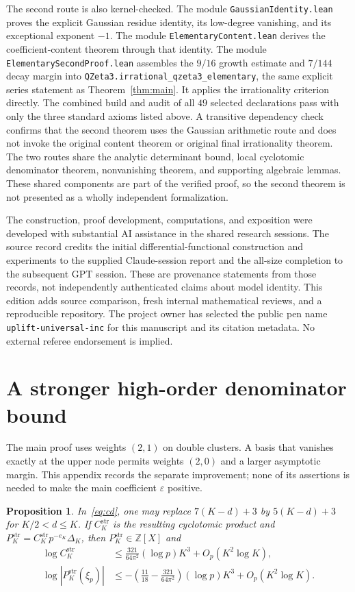 \documentclass[11pt,letterpaper]{article}
\numberwithin{equation}{section}
\newtheorem{proposition}[theorem]{Proposition}
\theoremstyle{remark}
\newcommand{\Z}{\mathbb Z}
\newcommand{\eps}{\varepsilon}
\begin{document}
The second route is also kernel-checked. The module \texttt{GaussianIdentity.lean} proves the explicit Gaussian residue identity, its low-degree vanishing, and its exceptional exponent $-1$. The module \texttt{ElementaryContent.lean} derives the coefficient-content theorem through that identity. The module \texttt{ElementarySecondProof.lean} assembles the $9/16$ growth estimate and $7/144$ decay margin into \texttt{QZeta3.irrational\_qzeta3\_elementary}, the same explicit series statement as Theorem~\ref{thm:main}. It applies the irrationality criterion directly. The combined build and audit of all $49$ selected declarations pass with only the three standard axioms listed above. A transitive dependency check confirms that the second theorem uses the Gaussian arithmetic route and does not invoke the original content theorem or original final irrationality theorem. The two routes share the analytic determinant bound, local cyclotomic denominator theorem, nonvanishing theorem, and supporting algebraic lemmas. These shared components are part of the verified proof, so the second theorem is not presented as a wholly independent formalization.

The construction, proof development, computations, and exposition were developed with substantial AI assistance in the shared research sessions. The source record credits the initial differential-functional construction and experiments to the supplied Claude-session report and the all-size completion to the subsequent GPT session. These are provenance statements from those records, not independently authenticated claims about model identity. This edition adds source comparison, fresh internal mathematical reviews, and a reproducible repository. The project owner has selected the public pen name \texttt{uplift-universal-inc} for this manuscript and its citation metadata. No external referee endorsement is implied.

\appendix
\section{A stronger high-order denominator bound}\label{app:stronger}

The main proof uses weights $(2,1)$ on double clusters. A basis that vanishes exactly at the upper node permits weights $(2,0)$ and a larger asymptotic margin. This appendix records the separate improvement; none of its assertions is needed to make the main coefficient $\eps$ positive.

\begin{proposition}\label{prop:stronger}
In~\eqref{eq:cd}, one may replace $7(K-d)+3$ by $5(K-d)+3$ for $K/2<d\le K$. If $C_K^{\mathrm{str}}$ is the resulting cyclotomic product and $P_K^{\mathrm{str}}=C_K^{\mathrm{str}}p^{-e_K}\Delta_K$, then $P_K^{\mathrm{str}}\in\Z[X]$ and
\begin{align*}
 \log C_K^{\mathrm{str}}
 &\le\frac{321}{64\pi^2}(\log p)K^3+O_p(K^2\log K),\\
 \log|P_K^{\mathrm{str}}(\xi_p)|
 &\le-\left(\frac{11}{18}-\frac{321}{64\pi^2}\right)
            (\log p)K^3+O_p(K^2\log K).
\end{align*}
\end{proposition}
\end{document}
